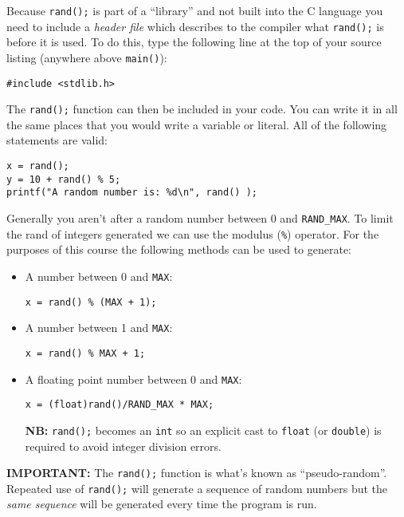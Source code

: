 \documentclass{lab}
\begin{document}
Because \texttt{rand();} is part of a ``library'' and not built into the C language you need to include a \textit{header file} which describes to the compiler what \texttt{rand();} is before it is used. To do this, type the following line at the top of your source listing (anywhere above \texttt{main()}):

\begin{lstlisting}[style=CStyle]
#include <stdlib.h>
\end{lstlisting}

The \texttt{rand();} function can then be included in your code. You can write it in all the same places that you would write a variable or literal. All of the following statements are valid:

\begin{lstlisting}[style=CStyle]
x = rand();
y = 10 + rand() % 5;
printf("A random number is: %d\n", rand() );
\end{lstlisting}

Generally you aren't after a random number between 0 and \texttt{RAND\_MAX}. To limit the rand of integers generated we can use the modulus (\texttt{\%}) operator. For the purposes of this course the following methods can be used to generate:

\begin{itemize}
\item A number between 0 and \texttt{MAX}:
\begin{lstlisting}[style=CStyle]
x = rand() % (MAX + 1);
\end{lstlisting}

\item A number between 1 and \texttt{MAX}:
\begin{lstlisting}[style=CStyle]
x = rand() % MAX + 1;
\end{lstlisting}

\item A floating point number between 0 and \texttt{MAX}:
\begin{lstlisting}[style=CStyle]
x = (float)rand()/RAND_MAX * MAX;
\end{lstlisting}
\textbf{NB:} \texttt{rand();} becomes an \texttt{int} so an explicit cast to \texttt{float} (or \texttt{double}) is required to avoid integer division errors.

\end{itemize}

\textbf{IMPORTANT:} The \texttt{rand();} function is what's known as ``pseudo-random''. Repeated use of \texttt{rand();} will generate a sequence of random numbers but the \textit{same sequence} will be generated every time the program is run.
\end{document}
